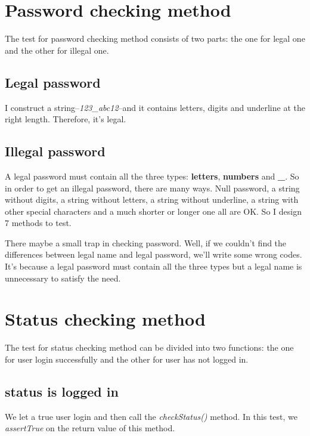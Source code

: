 \documentclass[a4paper]{report}
\begin{document}
\section{Password checking method}
\par The test for password checking method consists of two parts: the one for legal one and the other for illegal one.
\subsection{Legal password}
\par I construct a string--\emph{123\_abc12}--and it contains letters, digits and underline at the right length. Therefore, it's legal.
\subsection{Illegal password}
\par A legal password must contain all the three types: \textbf{letters}, \textbf{numbers} and \textbf{\_}. So in order to get an illegal password, there are many ways. Null password, a string without digits, a string without letters, a string without underline, a string with other special characters and a much shorter or longer one all are OK. So I design 7 methods to test. 
\par There maybe a small trap in checking password. Well, if we couldn't find the differences between legal name and legal password,  we'll write some wrong codes. It's because a legal password must contain all the three types but a legal name is unnecessary to satisfy the need.
\section{Status checking method}
\par The test for status checking method can be divided into two functions: the one for user login successfully and the other for user has not logged in.
\subsection{status is logged in }
\par We let a true user login and then call the \emph{checkStatus()} method. In this test, we \emph{assertTrue} on the return value of this method.
\end{document}
